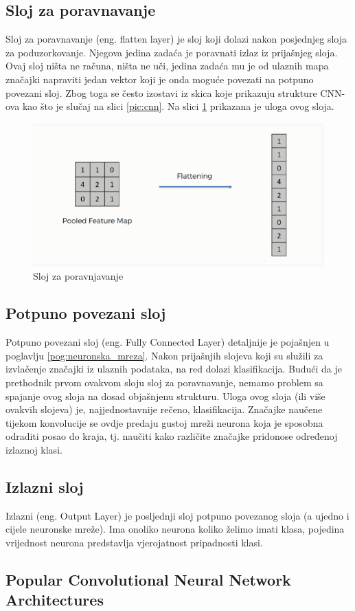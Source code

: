 \subsection{Sloj za poravnavanje}
Sloj za poravnavanje (eng. flatten layer) je sloj koji dolazi nakon posjednjeg sloja
za poduzorkovanje. Njegova jedina zadaća je poravnati izlaz iz prijašnjeg sloja.
Ovaj sloj ništa ne računa, ništa ne uči, jedina zadaća mu je od ulaznih mapa značajki
napraviti jedan vektor koji je onda moguće povezati na potpuno povezani sloj. Zbog
toga se često izostavi iz skica koje prikazuju strukture CNN-ova kao što je slučaj
na slici \ref{pic:cnn}. Na slici \ref{pic:flatten} prikazana je uloga ovog sloja.

\begin{figure}[htb]
    \centering
    \includegraphics[width=0.5\linewidth]{Chapters/neuronska_mreza/CNN/flatten.png} 
    \caption{Sloj za poravnjavanje \cite{flatten}}
    \label{pic:flatten}
\end{figure}


\subsection{Potpuno povezani sloj}
\label{sub:dense}
Potpuno povezani sloj (eng. Fully Connected Layer) detaljnije je pojašnjen u poglavlju
\ref{pog:neuronska_mreza}. Nakon prijašnjih slojeva koji su služili za izvlačenje
značajki iz ulaznih podataka, na red dolazi klasifikacija. Budući da je prethodnik
prvom ovakvom sloju sloj za poravnavanje, nemamo problem sa spajanje ovog sloja na dosad
objašnjenu strukturu. Uloga ovog sloja (ili više ovakvih slojeva) je, najjednostavnije
rečeno, klasifikacija. Značajke naučene tijekom konvolucije se ovdje predaju gustoj mreži
neurona koja je sposobna odraditi posao do kraja, tj. naučiti kako različite značajke
pridonose određenoj izlaznoj klasi. 

\subsection{Izlazni sloj}
\label{sub:output}
Izlazni (eng. Output Layer) je posljednji sloj potpuno povezanog sloja (a ujedno i cijele
neuronske mreže). Ima onoliko neurona koliko želimo imati klasa, pojedina vrijednost
neurona predstavlja vjerojatnost pripadnosti klasi. 


\subsection{Popular Convolutional Neural Network Architectures}
\cite{indian}